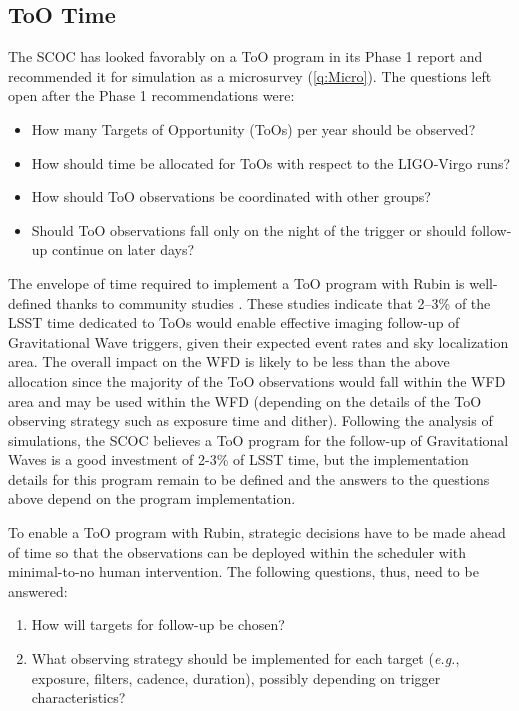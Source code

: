 \subsection{ToO Time}\label{q:ToO}
The SCOC has looked favorably on a ToO program in its Phase 1 report and recommended it for simulation as a microsurvey (\autoref{q:Micro}). The questions left open after the Phase 1 recommendations were:
\begin{itemize}
\item How many Targets of Opportunity (ToOs) per year should be observed?
\item How should time be allocated for ToOs with respect to the LIGO-Virgo runs?
\item How should ToO observations be coordinated with other groups?
\item Should ToO observations fall only on the night of the trigger or should follow-up continue on later days?
\end{itemize} 



The envelope of time required to implement a ToO program with Rubin is well-defined thanks to community studies \citep{https://doi.org/10.48550/arxiv.1812.04051, Andreoni_2022}. These studies indicate that 2--3\% of the LSST time dedicated to ToOs would enable effective imaging follow-up of Gravitational Wave triggers, given their expected event rates and sky localization area. The overall impact on the WFD is likely to be less than the above allocation since the majority of the ToO observations would fall within the WFD area and may be used within the WFD (depending on the details of the ToO observing strategy such as exposure time and dither). Following the analysis of simulations, the SCOC believes a ToO program for the follow-up of Gravitational Waves is a good investment of 2-3\% of LSST time, but the implementation details for this program remain to be defined and the answers to the questions above depend on the program implementation.

To enable a ToO program with Rubin, strategic decisions have to be made ahead of time so that the observations can be deployed within the scheduler with minimal-to-no human intervention. The following questions, thus, need to be answered:
\begin{enumerate}
\item How will targets for follow-up be chosen?
\item What observing strategy should be implemented for each target (\emph{e.g.}, exposure, filters, cadence, duration), possibly depending on trigger characteristics?

\end{enumerate}

